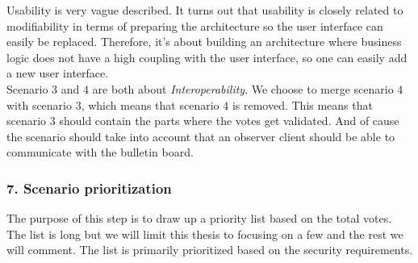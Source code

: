 \noindent
Usability is very vague described. It turns out that usability is closely related to modifiability in terms of preparing the architecture so the user interface can easily be replaced. Therefore, it's about building an architecture where business logic does not have a high coupling with the user interface, so one can easily add a new user interface. \\ 

\noindent
Scenario $3$ and $4$ are both about \textit{Interoperability}. We choose to merge scenario $4$ with scenario $3$, which means that scenario $4$ is removed. This means that scenario $3$ should contain the parts where the votes get validated. And of cause the scenario should take into account that an observer client should be able to communicate with the bulletin board.



\subsubsection{7. Scenario prioritization}
The purpose of this step is to draw up a priority list based on the total votes. The list is long but we will limit this thesis to focusing on a few and the rest we will comment. The list is primarily prioritized based on the security requirements.

